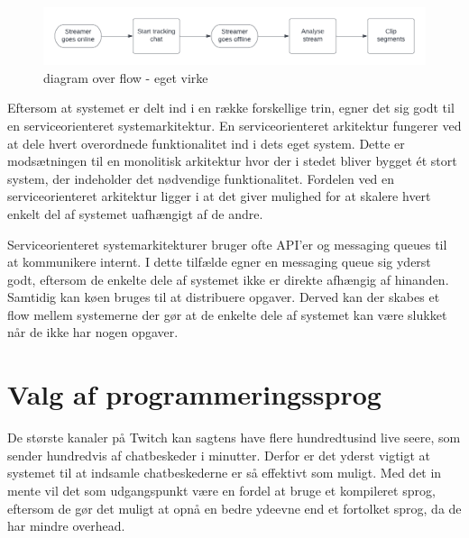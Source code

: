\documentclass{article}
\begin{document}
\begin{figure}[hp]
\centering
\includegraphics[width=\textwidth]{twitch-highlight-finder-flow.png}
\caption{diagram over flow - eget virke}
\end{figure}

Eftersom at systemet er delt ind i en række forskellige trin, egner det sig godt til en serviceorienteret systemarkitektur. En serviceorienteret arkitektur fungerer ved at dele hvert overordnede funktionalitet ind i dets eget system. Dette er modsætningen til en monolitisk arkitektur hvor der i stedet bliver bygget ét stort system, der indeholder det nødvendige funktionalitet. Fordelen ved en serviceorienteret arkitektur ligger i at det giver mulighed for at skalere hvert enkelt del af systemet uafhængigt af de andre.

Serviceorienteret systemarkitekturer bruger ofte API’er og messaging queues til at kommunikere internt. I dette tilfælde egner en messaging queue sig yderst godt, eftersom de enkelte dele af systemet ikke er direkte afhængig af hinanden. Samtidig kan køen bruges til at distribuere opgaver. Derved kan der skabes et flow mellem systemerne der gør at de enkelte dele af systemet kan være slukket når de ikke har nogen opgaver.

\section{Valg af programmeringssprog}
De største kanaler på Twitch kan sagtens have flere hundredtusind live seere, som sender hundredvis af chatbeskeder i minutter. Derfor er det yderst vigtigt at systemet til at indsamle chatbeskederne er så effektivt som muligt. Med det in mente vil det som udgangspunkt være en fordel at bruge et kompileret sprog, eftersom de gør det muligt at opnå en bedre ydeevne end et fortolket sprog, da de har mindre overhead.
\end{document}
